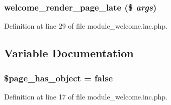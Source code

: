 \hypertarget{module__welcome_8inc_8php_ad04e9602964c582c2927f8fc09f0a7be}{
\subsubsection[{welcome\_\-render\_\-page\_\-late}]{\setlength{\rightskip}{0pt plus 5cm}welcome\_\-render\_\-page\_\-late (\$ {\em args})}}
\label{module__welcome_8inc_8php_ad04e9602964c582c2927f8fc09f0a7be}


Definition at line 29 of file module\_\-welcome.inc.php.



\subsection{Variable Documentation}
\hypertarget{module__welcome_8inc_8php_a5718ac85d1688a52f2d4fedd9a6b4cdf}{
\subsubsection[{\$page\_\-has\_\-object}]{\setlength{\rightskip}{0pt plus 5cm}\$page\_\-has\_\-object = false}}
\label{module__welcome_8inc_8php_a5718ac85d1688a52f2d4fedd9a6b4cdf}


Definition at line 17 of file module\_\-welcome.inc.php.

